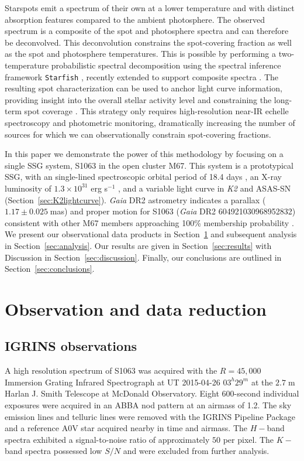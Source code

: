 \documentclass[trackchanges]{aastex631}
\begin{document}
Starspots emit a spectrum of their own at a lower temperature and with distinct absorption features compared to the ambient photosphere. The observed spectrum is a composite of the spot and photosphere spectra and can therefore be deconvolved. This deconvolution constrains the spot-covering fraction as well as the spot and photosphere temperatures. This is possible by performing a two-temperature probabilistic spectral decomposition using the spectral inference framework \texttt{Starfish} \citep{czekala15}, recently extended to support composite spectra \citep{gullysantiago17}. The resulting spot characterization can be used to anchor light curve information, providing insight into the overall stellar activity level and constraining the long-term spot coverage \citep{neff95}. This strategy only requires high-resolution near-IR echelle spectroscopy and photometric monitoring, dramatically increasing the number of sources for which we can observationally constrain spot-covering fractions.

In this paper we demonstrate the power of this methodology by focusing on a single SSG system, S1063 in the open cluster M67. This system is a prototypical SSG, with an single-lined spectroscopic orbital period of 18.4 days \citep{geller17}, an X-ray luminosity of $1.3\times10^{31}$ erg s$^{-1}$ \citep{vandenberg99}, and a variable light curve in \textit{K2} and ASAS-SN (Section~\ref{sec:K2lightcurve}). \emph{Gaia} DR2 astrometry \citep{2016A&A...595A...1G, 2018A&A...616A...1G} indicates a parallax ($1.17\pm0.025 \;$mas) and proper motion for S1063 (\emph{Gaia} DR2 604921030968952832) consistent with other M67 members  approaching 100\% membership probability \citep{2018ApJ...869....9G}. We present our observational data products in Section~\ref{sec:observations} and subsequent analysis in Section~\ref{sec:analysis}. Our results are given in Section~\ref{sec:results} with Discussion in Section~\ref{sec:discussion}. Finally, our conclusions are outlined in Section~\ref{sec:conclusions}.


\section{Observation and data reduction}
\label{sec:observations}


\subsection{IGRINS observations}
A high resolution spectrum of S1063 was acquired with the $R=45,000$ Immersion Grating Infrared Spectrograph \citep[IGRINS;][]{park14} at UT 2015-04-26 $03^h29^m$ at the $2.7\;$m Harlan J. Smith Telescope at McDonald Observatory.  Eight 600-second individual exposures were acquired in an ABBA nod pattern at an airmass of 1.2.  The sky emission lines and telluric lines were removed with the IGRINS Pipeline Package  \citep[PLP;][]{jaejoonlee16} and a reference A0V star acquired nearby in time and airmass.
The $H-$band spectra exhibited a signal-to-noise ratio of approximately $50$ per pixel.
The $K-$band spectra possessed low $S/N$ and were excluded from further analysis.
\end{document}
